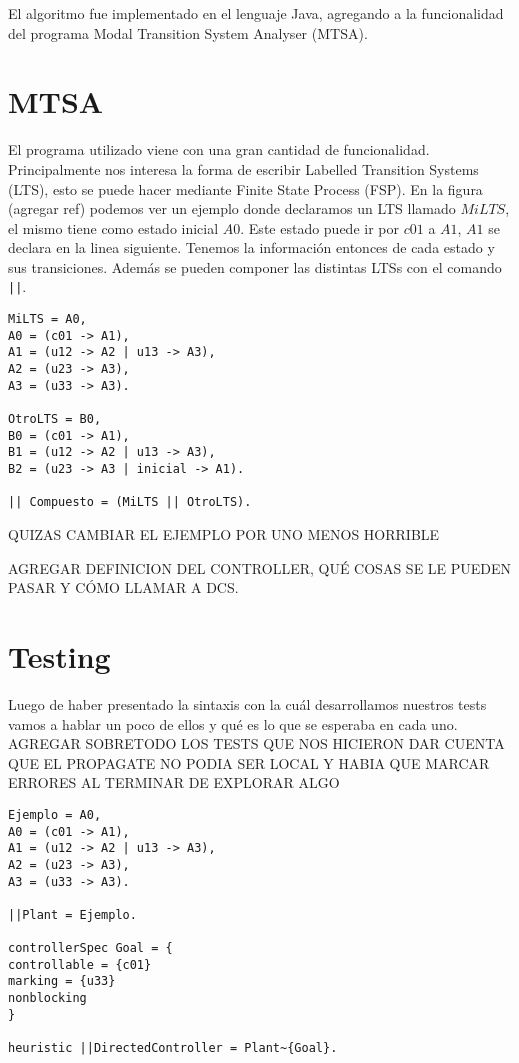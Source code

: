 
El algoritmo fue implementado en el lenguaje Java, agregando a la funcionalidad del programa Modal Transition System Analyser (MTSA)\cite{mtsaRepo}.

\section{MTSA}
El programa utilizado viene con una gran cantidad de funcionalidad. Principalmente nos interesa la forma de escribir Labelled Transition Systems (LTS), esto se puede hacer mediante Finite State Process (FSP). En la figura (agregar ref) podemos ver un ejemplo donde declaramos un LTS llamado $MiLTS$, el mismo tiene como estado inicial $A0$. Este estado puede ir por $c01$ a $A1$, $A1$ se declara en la linea siguiente. Tenemos la información entonces de cada estado y sus transiciones. Además se pueden componer las distintas LTSs con el comando \texttt{||}.

\begin{lstlisting}[language = mtsa, caption=Ejemplo de LTS y composición]
MiLTS = A0,
A0 = (c01 -> A1),
A1 = (u12 -> A2 | u13 -> A3),
A2 = (u23 -> A3),
A3 = (u33 -> A3).

OtroLTS = B0,
B0 = (c01 -> A1),
B1 = (u12 -> A2 | u13 -> A3),
B2 = (u23 -> A3 | inicial -> A1).

|| Compuesto = (MiLTS || OtroLTS).
\end{lstlisting}
QUIZAS CAMBIAR EL EJEMPLO POR UNO MENOS HORRIBLE

AGREGAR DEFINICION DEL CONTROLLER, QUÉ COSAS SE LE PUEDEN PASAR Y CÓMO LLAMAR A DCS.

\section{Testing}
Luego de haber presentado la sintaxis con la cuál desarrollamos nuestros tests vamos a hablar un poco de ellos y qué es lo que se esperaba en cada uno. AGREGAR SOBRETODO LOS TESTS QUE NOS HICIERON DAR CUENTA QUE EL PROPAGATE NO PODIA SER LOCAL Y HABIA QUE MARCAR ERRORES AL TERMINAR DE EXPLORAR ALGO

\begin{lstlisting}[language = mtsa, caption=Ejemplo de test]
Ejemplo = A0,
A0 = (c01 -> A1),
A1 = (u12 -> A2 | u13 -> A3),
A2 = (u23 -> A3),
A3 = (u33 -> A3).

||Plant = Ejemplo.

controllerSpec Goal = {
controllable = {c01}
marking = {u33}
nonblocking
}

heuristic ||DirectedController = Plant~{Goal}.
\end{lstlisting}
